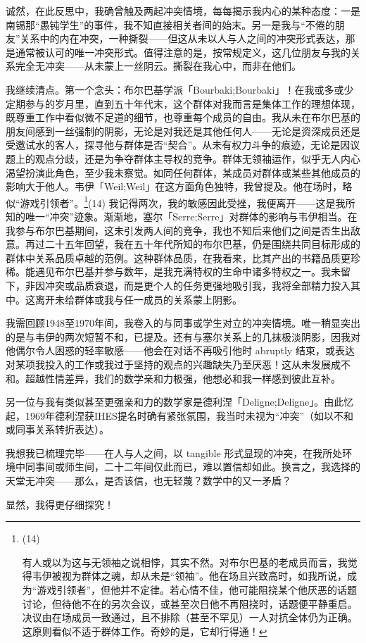 诚然，在此反思中，我确曾触及两起冲突情境，每每揭示我内心的某种态度：一是南锡那“愚钝学生”的事件，我不知直接相关者间的始末。另一是我与“不倦的朋友”关系中的内在冲突，一种撕裂——但这从未以人与人之间的冲突形式表达，那是通常被认可的唯一冲突形式。值得注意的是，按常规定义，这几位朋友与我的关系完全无冲突——从未蒙上一丝阴云。撕裂在我心中，而非在他们。

我继续清点。第一个念头：布尔巴基学派「Bourbaki;Bourbaki」！在我或多或少定期参与的岁月里，直到五十年代末，这个群体对我而言是集体工作的理想体现，既尊重工作中看似微不足道的细节，也尊重每个成员的自由。我从未在布尔巴基的朋友间感到一丝强制的阴影，无论是对我还是其他任何人——无论是资深成员还是受邀试水的客人，探寻他与群体是否“契合”。从未有权力斗争的痕迹，无论是因议题上的观点分歧，还是为争夺群体主导权的竞争。群体无领袖运作，似乎无人内心渴望扮演此角色，至少我未察觉。如同任何群体，某成员对群体或某些其他成员的影响大于他人。韦伊「Weil;Weil」在这方面角色独特，我曾提及。他在场时，略似“游戏引领者”。\footnote{(14)\par 有人或以为这与无领袖之说相悖，其实不然。对布尔巴基的老成员而言，我觉得韦伊被视为群体之魂，却从未是“领袖”。他在场且兴致高时，如我所说，成为“游戏引领者”，但他并不定律。若心情不佳，他可能阻挠某个他厌恶的话题讨论，但待他不在的另次会议，或甚至次日他不再阻挠时，话题便平静重启。决议由在场成员一致通过，且不排除（甚至不罕见）一人对抗全体仍为正确。这原则看似不适于群体工作。奇妙的是，它却行得通！}(14) 我记得两次，我的敏感因此受挫，我便离开——这是我所知的唯一“冲突”迹象。渐渐地，塞尔「Serre;Serre」对群体的影响与韦伊相当。在我参与布尔巴基期间，这未引发两人间的竞争，我也不知后来他们之间是否生出敌意。再过二十五年回望，我在五十年代所知的布尔巴基，仍是围绕共同目标形成的群体中关系品质卓越的范例。这种群体品质，在我看来，比其产出的书籍品质更珍稀。能遇见布尔巴基并参与数年，是我充满特权的生命中诸多特权之一。我未留下，非因冲突或品质衰退，而是更个人的任务更强地吸引我，我将全部精力投入其中。这离开未给群体或我与任一成员的关系蒙上阴影。

我需回顾1948至1970年间，我卷入的与同事或学生对立的冲突情境。唯一稍显突出的是与韦伊的两次短暂不和，已提及。还有与塞尔关系上的几抹极淡阴影，因我对他偶尔令人困惑的轻率敏感——他会在对话不再吸引他时 abruptly 结束，或表达对某项我投入的工作或我过于坚持的观点的兴趣缺失乃至厌恶！这从未发展成不和。超越性情差异，我们的数学亲和力极强，他想必和我一样感到彼此互补。

另一位与我有类似甚至更强亲和力的数学家是德利涅「Deligne;Deligne」。由此忆起，1969年德利涅获IHES提名时确有紧张氛围，我当时未视为“冲突”（如以不和或同事关系转折表达）。

我想我已梳理完毕——在人与人之间，以 tangible 形式显现的冲突，在我所处环境中同事间或师生间，二十二年间仅此而已，难以置信却如此。换言之，我选择的天堂无冲突——那么，是否该信，也无轻蔑？数学中的又一矛盾？

显然，我得更仔细探究！